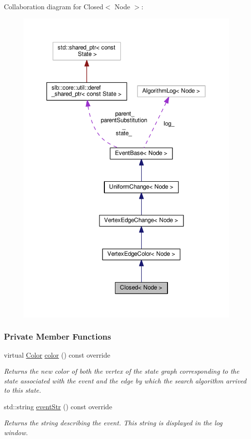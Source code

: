 Collaboration diagram for Closed$<$ Node $>$\+:\nopagebreak
\begin{figure}[H]
\begin{center}
\leavevmode
\includegraphics[width=350pt]{structClosed__coll__graph}
\end{center}
\end{figure}
\subsubsection*{Private Member Functions}
\begin{DoxyCompactItemize}
\item 
virtual \hyperlink{colors_8h_ab87bacfdad76e61b9412d7124be44c1c}{Color} \hyperlink{structClosed_a0cd2a0aa22be8c28e792d88b832952b7}{color} () const override
\begin{DoxyCompactList}\small\item\em Returns the new color of both the vertex of the state graph corresponding to the state associated with the event and the edge by which the search algorithm arrived to this state. \end{DoxyCompactList}\item 
std\+::string \hyperlink{structClosed_a4675bd1d16d7e3063bfe05c4fc6d0cb0}{event\+Str} () const override
\begin{DoxyCompactList}\small\item\em Returns the string describing the event. This string is displayed in the log window. \end{DoxyCompactList}\end{DoxyCompactItemize}
